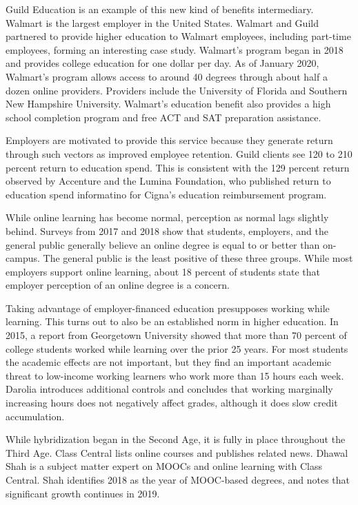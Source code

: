 \documentclass[review]{elsarticle}
\begin{document}
Guild Education is an example of this new kind of benefits intermediary. Walmart is the largest employer in the United States.
Walmart and Guild partnered to provide higher education to Walmart employees, including part-time employees, forming an interesting case study.
Walmart's program began in 2018 and provides college education for one dollar per day\cite{walmart_2018}.
As of January 2020, Walmart's program allows access to around 40 degrees through about half a dozen online providers\cite{guild_walmart_2020}.
Providers include the University of Florida and Southern New Hampshire University.
Walmart's education benefit also provides a high school completion program and free ACT and SAT preparation assistance.

Employers are motivated to provide this service because they generate return through such vectors as improved employee retention.
Guild clients see 120 to 210 percent return to education spend\cite{hunter_2019}.
This is consistent with the 129 percent return observed by Accenture and the Lumina Foundation,
who published return to education spend informatino for Cigna's education reimbursement program\cite{mccann_2016}.

While online learning has become normal, perception as normal lags slightly behind.
Surveys from 2017 and 2018 show that students, employers, and the general public generally believe
an online degree is equal to or better than on-campus\cite{venable_2019}.
The general public is the least positive of these three groups.
While most employers support online learning,
about 18 percent of students state that employer perception of an online degree is a concern.

Taking advantage of employer-financed education presupposes working while learning.
This turns out to also be an established norm in higher education.
In 2015, a report from Georgetown University showed that more than 70 percent of college students
worked while learning over the prior 25 years\cite{carnevale2015learning}.
For most students the academic effects are not important,
but they find an important academic threat to low-income working learners who work more than 15 hours each week.
Darolia\cite{darolia2014working} introduces additional controls and concludes that working
marginally increasing hours does not negatively affect grades, although it does slow credit accumulation.

While hybridization began in the Second Age, it is fully in place throughout the Third Age.
Class Central lists online courses and publishes related news.
Dhawal Shah is a subject matter expert on MOOCs and online learning with Class Central.
Shah identifies 2018 as the year of MOOC-based degrees, and notes that significant growth continues in 2019\cite{shah_2019}.
\end{document}
